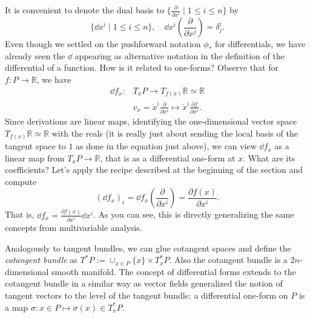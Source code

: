 \documentclass[english,fontsize=11pt,paper=b5]{scrbook}
\numberwithin{equation}{chapter}
\theoremstyle{definition}
\begin{document}
    It is convenient to denote the dual basis to $\{\frac{\partial}{\partial x^i} \mid 1\leq i \leq n\}$ by
    \begin{equation}
      \{ \dd x^i \mid 1 \leq i \leq n \}, \quad \dd x^i\left(\frac{\partial}{\partial x^j}\right) = \delta_j^i.
    \end{equation}
    Even though we settled on the pushforward notation $\phi_*$ for differentials, we have already seen the $\dd$ appearing as alternative notation in the definition of the differential of a function.
    How is it related to one-forms?
    Observe that for $f : P \to \mathbb{R}$, we have
    \begin{align}
      \dd f_x : & T_x P \to T_{f(x)} \mathbb{R} \simeq \mathbb{R} \\
                & v_x = \dot x^i \frac{\partial}{\partial x^i} \mapsto \dot x^i \frac{\partial f}{\partial x^i}.
    \end{align}
    Since derivations are linear maps, identifying the one-dimensional vector space $T_{f(x)}\mathbb{R} \simeq \mathbb{R}$ with the reals (it is really just about sending the local basis of the tangent space to $1$ as done in the equation just above), we can view $\dd f_x$ as a linear map from $T_x P \to \mathbb{R}$, that is as a differential one-form at $x$.
    What are its coefficients? Let's apply the recipe described at the beginning of the section and compute
    \begin{equation}
      (\dd f_x)_i = \dd f_x\left(\frac{\partial}{\partial x^i}\right) = \frac{\partial f(x)}{\partial x^i}.
    \end{equation}
    That is, $\dd f_x = \frac{\partial f(x)}{\partial x^i} \dd x^i$.
    As you can see, this is directly generalizing the same concepts from multivariable analysis.

    Analogously to tangent bundles, we can glue cotangent spaces and define the \emph{cotangent bundle} as $T^*P := \cup_{x\in P} \{x\}\times T^*_x P$. Also the cotangent bundle is a $2n$-dimensional smooth manifold.
    The concept of differential forms extends to the cotangent bundle in a similar way as vector fields generalized the notion of tangent vectors to the level of the tangent bundle: a differential one-form on $P$ is a map $\sigma : x\in P \mapsto \sigma(x) \in T^*_x P$.
\end{document}
